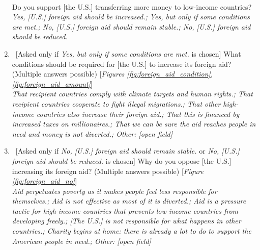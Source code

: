 \begin{enumerate}[resume]
\\
Do you support [the U.S.] transferring more money to low-income countries?
\\ \textit{Yes, [U.S.] foreign aid should be increased.; Yes, but only if some conditions are met.; No, [U.S.] foreign aid should remain stable.; No, [U.S.] foreign aid should be reduced.}
\item ~[Asked only if \textit{Yes, but only if some conditions are met.} is chosen] \label{q:foreign_aid_condition} What conditions should be required for [the U.S.] to increase its foreign aid? (Multiple answers possible) [\textit{Figures \ref{fig:foreign_aid_condition}, \ref{fig:foreign_aid_amount}}]
\\ \textit{That recipient countries comply with climate targets and human rights.; That recipient countries cooperate to fight illegal migrations.; That other high-income countries also increase their foreign aid.; That this is financed by increased taxes on millionaires.; That we can be sure the aid reaches people in need and money is not diverted.; Other: [open field]}
\item ~[Asked only if \textit{No, [U.S.] foreign aid should remain stable.} or \textit{No, [U.S.] foreign aid should be reduced.} is chosen] \label{q:foreign_aid_no} Why do you oppose [the U.S.] increasing its foreign aid? (Multiple answers possible) [\textit{Figure \ref{fig:foreign_aid_no}}]
\\ \textit{Aid perpetuates poverty as it makes people feel less responsible for themselves.; Aid is not effective as most of it is diverted.; Aid is a pressure tactic for high-income countries that prevents low-income countries from developing freely.; [The U.S.] is not responsible for what happens in other countries.; Charity begins at home: there is already a lot to do to support the American people in need.; Other: [open field]}
\end{enumerate}

